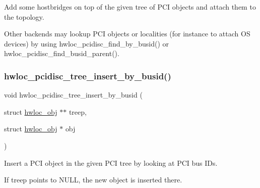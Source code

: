 Add some hostbridges on top of the given tree of P\+CI objects and attach them to the topology. 

Other backends may lookup P\+CI objects or localities (for instance to attach OS devices) by using hwloc\+\_\+pcidisc\+\_\+find\+\_\+by\+\_\+busid() or hwloc\+\_\+pcidisc\+\_\+find\+\_\+busid\+\_\+parent(). \mbox{\label{a00232_gab76ddc4f55db8101ef0d44317965128c}} 
\subsubsection{\texorpdfstring{hwloc\+\_\+pcidisc\+\_\+tree\+\_\+insert\+\_\+by\+\_\+busid()}{hwloc\_pcidisc\_tree\_insert\_by\_busid()}}
{\footnotesize\ttfamily void hwloc\+\_\+pcidisc\+\_\+tree\+\_\+insert\+\_\+by\+\_\+busid (\begin{DoxyParamCaption}\item[{struct \hyperlink{a00238}{hwloc\+\_\+obj} $\ast$$\ast$}]{treep,  }\item[{struct \hyperlink{a00238}{hwloc\+\_\+obj} $\ast$}]{obj }\end{DoxyParamCaption})}



Insert a P\+CI object in the given P\+CI tree by looking at P\+CI bus I\+Ds. 

If {\ttfamily treep} points to {\ttfamily N\+U\+LL}, the new object is inserted there. 